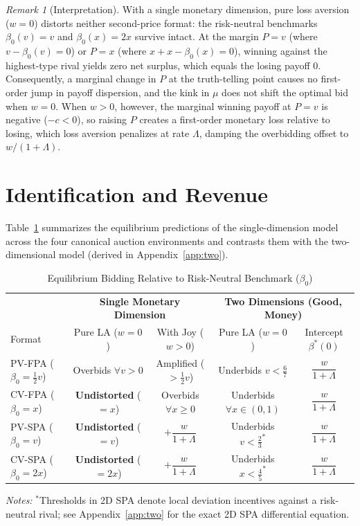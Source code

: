 \documentclass[11pt,a4paper]{article}
\theoremstyle{remark}
\newtheorem{remark}{Remark}
\begin{document}
\begin{remark}[Interpretation]
With a single monetary dimension, pure loss aversion ($w=0$) distorts neither
second-price format: the risk-neutral benchmarks $\beta_0(v)=v$ and $\beta_0(x)=2x$
survive intact. At the margin $P=v$ (where $v-\beta_0(v)=0$) or $P=x$ (where
$x+x-\beta_0(x)=0$), winning against the highest-type rival yields zero net surplus,
which equals the losing payoff $0$. Consequently, a marginal change in $P$ at the
truth-telling point causes no first-order jump in payoff dispersion, and the kink in
$\mu$ does not shift the optimal bid when $w=0$. When $w>0$, however, the marginal
winning payoff at $P=v$ is negative ($-c<0$), so raising $P$ creates a first-order
monetary loss relative to losing, which loss aversion penalizes at rate $\Lambda$,
damping the overbidding offset to $w/(1+\Lambda)$.
\end{remark}

\section{Identification and Revenue}
\label{sec:id}
Table~\ref{tab:summary} summarizes the equilibrium predictions of the single-dimension
model across the four canonical auction environments and contrasts them with the
two-dimensional model (derived in Appendix~\ref{app:two}).

\begin{table}[ht]
\centering
\caption{Equilibrium Bidding Relative to Risk-Neutral Benchmark ($\beta_0$)}
\label{tab:summary}
\vspace{0.5em}
\begin{tabular}{lcccc}
\hline\hline
& \multicolumn{2}{c}{\textbf{Single Monetary Dimension}} & \multicolumn{2}{c}{\textbf{Two Dimensions (Good, Money)}} \\
Format & Pure LA ($w=0$) & With Joy ($w>0$) & Pure LA ($w=0$) & Intercept $\beta^*(0)$ \\
\hline
PV-FPA ($\beta_0=\tfrac12 v$) & Overbids $\forall v>0$ & Amplified ($> \tfrac12 v$) & Underbids $v<\tfrac67$ & $\dfrac{w}{1+\Lambda}$ \\
CV-FPA ($\beta_0=x$) & \textbf{Undistorted} ($=x$) & Overbids $\forall x\ge 0$ & Underbids $\forall x\in(0,1)$ & $\dfrac{w}{1+\Lambda}$ \\
PV-SPA ($\beta_0=v$) & \textbf{Undistorted} ($=v$) & $+ \dfrac{w}{1+\Lambda}$ & Underbids $v<\tfrac23^*$ & $\dfrac{w}{1+\Lambda}$ \\
CV-SPA ($\beta_0=2x$) & \textbf{Undistorted} ($=2x$) & $+ \dfrac{w}{1+\Lambda}$ & Underbids $x<\tfrac45^*$ & $\dfrac{w}{1+\Lambda}$ \\
\hline\hline
\end{tabular}
\par\smallskip\footnotesize
\emph{Notes:} $^*$Thresholds in 2D SPA denote local deviation incentives against a risk-neutral rival; see Appendix~\ref{app:two} for the exact 2D SPA differential equation.
\end{table}
\end{document}
